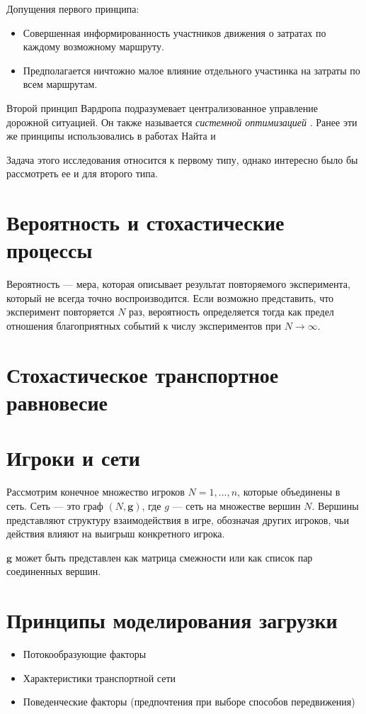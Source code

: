 Допущения первого принципа:
\begin{itemize}
	\item Совершенная информированность участников движения о затратах по каждому возможному маршруту.
	\item Предполагается ничтожно малое влияние отдельного участинка на затраты по всем маршрутам.
\end{itemize}

Второй принцип Вардропа подразумевает централизованное управление дорожной ситуацией. Он также называется \textit{системной оптимизацией} \cite[26-27]{gas}. Ранее эти же принципы использовались в работах Найта \cite{knight} и 

Задача этого исследования относится к первому типу, однако интересно было бы рассмотреть ее и для второго типа. 


\section{Вероятность и стохастические процессы}

Вероятность --- мера, которая описывает результат повторяемого эксперимента, который не всегда точно воспроизводится. Если возможно представить, что эксперимент повторяется $N$ раз, вероятность определяется тогда как предел отношения благоприятных событий к числу экспериментов при $N\to\infty$.


\section{Стохастическое транспортное равновесие} \cite[316, Ю. Е. Нестеров, С. В. Шпирко]{gas}

\section{Игроки и сети} \cite[4]{GandN}

Рассмотрим конечное множество игроков $N = {1,...,n}$, которые объединены в сеть. 
Сеть --- это граф $(N, \mathbf{g})$, где $g$ --- сеть на множестве вершин $N$.
Вершины представляют структуру взаимодействия в игре, обозначая других игроков, чьи действия влияют на выигрыш конкретного игрока.

$\mathbf{g}$ может быть представлен как матрица смежности или как список пар соединенных вершин.


\section{Принципы моделирования загрузки}
\begin{itemize}
	\item Потокообразующие факторы
	\item Характеристики транспортной сети
	\item Поведенческие факторы (предпочтения при выборе способов передвижения)
\end{itemize}

